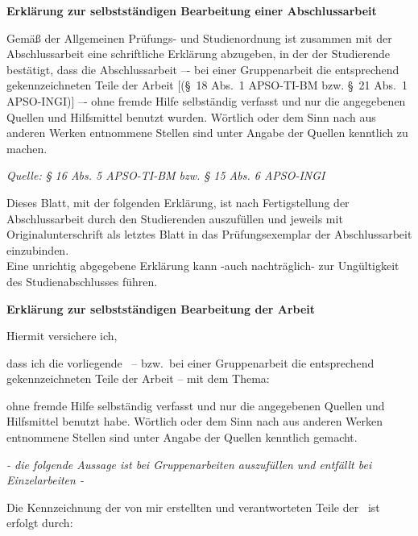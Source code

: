\clearpage
\thispagestyle{plain}
\ITocEntryStatement
\textbf{\sffamily\large Erklärung zur selbstständigen Bearbeitung einer Abschlussarbeit}

{\footnotesize
Gemäß der Allgemeinen Prüfungs- und Studienordnung ist zusammen mit der Abschlussarbeit eine schriftliche Erklärung abzugeben, in der der Studierende bestätigt, dass die Abschlussarbeit \glqq–- bei einer Gruppenarbeit die entsprechend gekennzeichneten Teile der Arbeit [(§~18 Abs.~1 APSO-TI-BM bzw. §~21 Abs.~1 APSO-INGI)] –- ohne fremde Hilfe selbständig verfasst und nur die angegebenen Quellen und Hilfsmittel benutzt wurden. Wörtlich oder dem Sinn nach aus anderen Werken entnommene Stellen sind unter Angabe der Quellen kenntlich zu machen.\grqq
}

\hfill {\em\footnotesize Quelle: § 16 Abs. 5 APSO-TI-BM bzw. § 15 Abs. 6 APSO-INGI}

{\footnotesize
Dieses Blatt, mit der folgenden Erklärung, ist nach Fertigstellung der Abschlussarbeit durch den Studierenden auszufüllen und jeweils mit Originalunterschrift als letztes Blatt in das Prüfungsexemplar der Abschlussarbeit einzubinden.\\
Eine unrichtig abgegebene Erklärung kann -auch nachträglich- zur Ungültigkeit des Studienabschlusses führen.
}


\vspace{1cm}
\textbf{\sffamily Erklärung zur selbstständigen Bearbeitung der Arbeit}

Hiermit versichere ich,
\par\noindent{}    \makebox[8cm]{\hrulefill}
\par\noindent{} \makebox[8cm]{\hrulefill}

dass ich die vorliegende \IthesisKindDE\ -- bzw.\ bei einer Gruppenarbeit die entsprechend gekennzeichneten Teile der Arbeit -- mit dem Thema:

\textbf{\IthesisTitle}

ohne fremde Hilfe selbständig verfasst und nur die angegebenen Quellen und Hilfsmittel benutzt habe.
Wörtlich oder dem Sinn nach aus anderen Werken entnommene Stellen sind unter Angabe der Quellen kenntlich gemacht.

\begin{center}
  \emph{\footnotesize- die folgende Aussage ist bei Gruppenarbeiten auszufüllen und entfällt bei Einzelarbeiten -}
\end{center}

Die Kennzeichnung der von mir erstellten und verantworteten Teile der \IthesisKindDE\ ist erfolgt durch:

